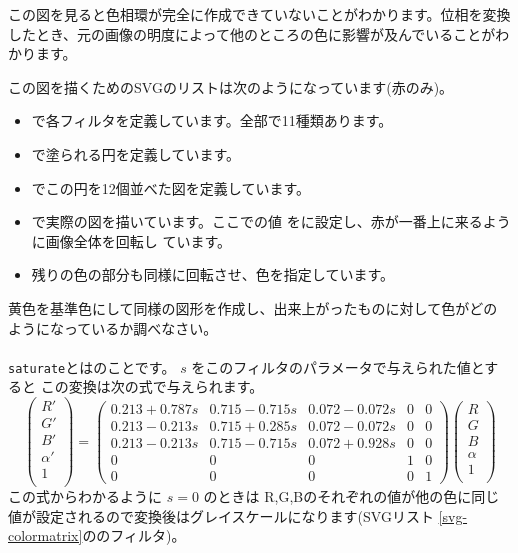 この図を見ると色相環が完全に作成できていないことがわかります。位相を変換
したとき、元の画像の明度によって他のところの色に影響が及んでいることがわ
かります。

この図を描くためのSVGのリストは次のようになっています(赤のみ)。

{}
\begin{itemize}
 \item {}で各フィルタを定義しています。全部で11種類あります。
 \item {}で塗られる円を定義しています。
 \item {}でこの円を12個並べた図を定義しています。
 \item {}で実際の図を描いています。ここでの値
       をに設定し、赤が一番上に来るように画像全体を回転し
       ています。
 \item 残りの色の部分も同様に回転させ、色を指定しています。
\end{itemize}
\begin{Problem}
 黄色を基準色にして同様の図形を作成し、出来上がったものに対して色がどの
 ようになっているか調べなさい。
\end{Problem}
\paragraph{}
\texttt{saturate}とはのことです。
$s$ をこのフィルタのパラメータで与えられた値とすると
この変換は次の式で与えられます。
\[
 \left(\begin{array}{c}
  R'\\G'\\B'\\\alpha'\\1\\
       \end{array}\right)=
\left(\begin{array}{ccccc}
0.213+0.787s&  0.715-0.715s&  0.072-0.072s& 0 & 0\\
0.213-0.213s&  0.715+0.285s&  0.072-0.072s& 0 & 0\\
0.213-0.213s&  0.715-0.715s&  0.072+0.928s& 0 & 0\\
     0      &         0    &       0      & 1 & 0 \\
     0      &         0    &       0      & 0 & 1
      \end{array}\right)
 \left(\begin{array}{c}
  R\\G\\B\\\alpha\\1\\
       \end{array}\right)
\]
この式からわかるように $s=0$ のときは R,G,Bのそれぞれの値が他の色に同じ
値が設定されるので変換後はグレイスケールになります(SVGリスト
\ref{svg-colormatrix}ののフィルタ)。


